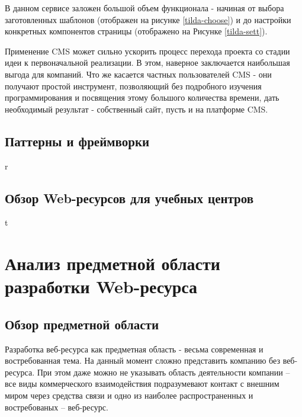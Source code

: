 
    В данном сервисе заложен большой объем функционала - начиная от выбора заготовленных шаблонов (отображен на рисунке \ref{tilda-choose}) и до настройки конкретных компонентов страницы (отображено на Рисунке \ref{tilda-sett}).



    Применение CMS может сильно ускорить процесс перехода проекта со стадии идеи к первоначальной реализации.
    В этом, наверное заключается наибольшая выгода для компаний.
    Что же касается частных пользователей CMS - они получают простой инструмент, позволяющий без подробного изучения программирования и посвящения этому большого количества времени, дать необходимый результат - собственный сайт, пусть и на платформе CMS.

\subsection{Паттерны и фреймворки}
r
\subsection{Обзор Web-ресурсов для учебных центров}
t



















\section{Анализ предметной области разработки Web-ресурса}
\subsection{Обзор предметной области}
    Разработка веб-ресурса как предметная область - весьма современная и востребованная тема.
    На данный момент сложно представить компанию без веб-ресурса.
    При этом даже можно не указывать область деятельности компании -- все виды коммерческого взаимодействия подразумевают контакт с внешним миром через средства связи и одно из наиболее распространенных и востребованых -- веб-ресурс.
    
